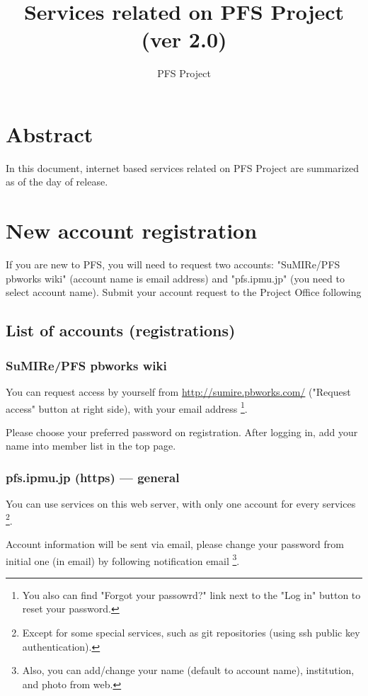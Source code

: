 \documentclass[a4paper,notitlepage]{article}
\title{Services related on PFS Project (ver 2.0)}
\author{PFS Project}
\begin{document}
\maketitle
\tableofcontents

\section{Abstract}

In this document, internet based services related on PFS Project are summarized 
as of the day of release. 

\section{New account registration}

If you are new to PFS, you will need to request two accounts: 
"SuMIRe/PFS pbworks wiki" (account name is email address) 
and "pfs.ipmu.jp" (you need to select account name). 
Submit your account request to the Project Office following 

\subsection{List of accounts (registrations)}

\subsubsection{SuMIRe/PFS pbworks wiki}

You can request access by yourself from \url{http://sumire.pbworks.com/} 
("Request access" button at right side), with your email address
\footnote{You also can find "Forgot your passowrd?" link next to the "Log in" 
button to reset your password.}.

Please choose your preferred password on registration. 
After logging in, add your name into member list in the top page. 

\subsubsection{pfs.ipmu.jp (https) --- general}

You can use services on this web server, with only one account for every 
services 
\footnote{Except for some special services, such as git repositories (using 
ssh public key authentication).}.

Account information will be sent via email, please change your password 
from initial one (in email) by following notification email 
\footnote{Also, you can add/change your name (default to account name), 
institution, and photo from web.}. 
\end{document}
